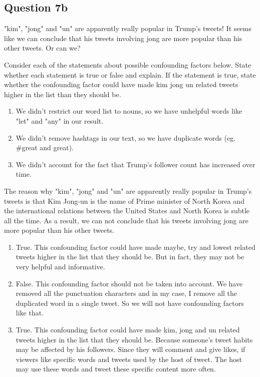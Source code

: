 \documentclass[11pt]{article}
\providecommand{\tightlist}{%
      \setlength{\itemsep}{0pt}\setlength{\parskip}{0pt}}
\begin{document}
    \subsection{Question 7b}\label{question-7b}

"kim", "jong" and "un" are apparently really popular in Trump's tweets!
It seems like we can conclude that his tweets involving jong are more
popular than his other tweets. Or can we?

Consider each of the statements about possible confounding factors
below. State whether each statement is true or false and explain. If the
statement is true, state whether the confounding factor could have made
kim jong un related tweets higher in the list than they should be.

\begin{enumerate}
\def\labelenumi{\arabic{enumi}.}
\tightlist
\item
  We didn't restrict our word list to nouns, so we have unhelpful words
  like "let" and "any" in our result.
\item
  We didn't remove hashtags in our text, so we have duplicate words (eg.
  \#great and great).
\item
  We didn't account for the fact that Trump's follower count has
  increased over time.
\end{enumerate}

    The reason why "kim", "jong" and "un" are apparently really popular in
Trump's tweets is that Kim Jong-un is the name of Prime minister of
North Korea and the international relations between the United States
and North Korea is subtle all the time. As a result, we can not conclude
that his tweets involving jong are more popular than his other tweets.

\begin{enumerate}
\def\labelenumi{\arabic{enumi}.}
\tightlist
\item
  True. This confounding factor could have made maybe, try and lowest
  related tweets higher in the list that they should be. But in fact,
  they may not be very helpful and informative.
\item
  False. This confounding factor should not be taken into account. We
  have removed all the punctuation characters and in my case, I remove
  all the duplicated word in a single tweet. So we will not have
  confounding factors like that.
\item
  True. This confounding factor could have made kim, jong and un related
  tweets higher in the list that they should be. Because someone's tweet
  habits may be affected by his followers. Since they will comment and
  give likes, if viewers like specific words and tweets used by the host
  of tweet. The host may use these words and tweet these specific
  content more often.
\end{enumerate}
\end{document}
